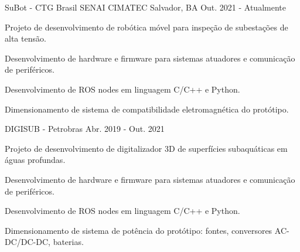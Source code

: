 

\begin{cventries}

  \cventry
    {SuBot - CTG Brasil} %
    {SENAI CIMATEC} %
    {Salvador, BA} %
    {Out. 2021 - Atualmente} %
    {
      \begin{cvitems} %
        \item {Projeto de desenvolvimento de robótica móvel para inspeção de subestações de alta tensão.}
        \item {Desenvolvimento de hardware e firmware para sistemas atuadores e comunicação de periféricos.}
        \item {Desenvolvimento de ROS nodes em linguagem C/C++ e Python.}
        \item {Dimensionamento de sistema de compatibilidade eletromagnética do protótipo.}
      \end{cvitems}
    }


  \cventry
    {DIGISUB - Petrobras} %
    {} %
    {} %
    {Abr. 2019 - Out. 2021} %
    {
      \begin{cvitems} %
        \item {Projeto de desenvolvimento de digitalizador 3D de superfícies subaquáticas em águas profundas.}
        \item {Desenvolvimento de hardware e firmware para sistemas atuadores e comunicação de periféricos.}
        \item {Desenvolvimento de ROS nodes em linguagem C/C++ e Python.}
        \item {Dimensionamento de sistema de potência do protótipo: fontes, conversores AC-DC/DC-DC, baterias.}
      \end{cvitems}
    }



\end{cventries}
